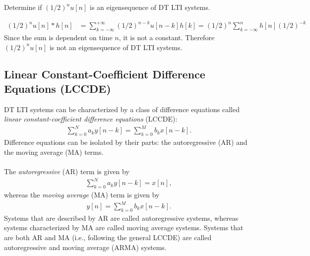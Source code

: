 \documentclass{report}
\begin{document}
\begin{example}
    Determine if $(1/2)^n u[n]$ is an eigensequence of DT LTI systems.
\end{example}
\begin{solution}
    \begin{align*}
        (1/2)^n u[n] * h[n] &= \sum_{k=-\infty}^{+\infty} (1/2)^{n-k}u[n-k]h[k] = (1/2)^n \sum_{k=-\infty}^{n} h[n](1/2)^{-k}
    \end{align*}
    Since the sum is dependent on time $n$, it is not a constant. Therefore $(1/2)^n u[n]$ is not an eigensequence of DT LTI systems.
\end{solution}

\subsection{Linear Constant-Coefficient Difference Equations (LCCDE)}
DT LTI systems can be characterized by a class of difference equations called 
\emph{linear constant-coefficient difference equations} (LCCDE):
\begin{align}
    \sum_{k=0}^{N} a_k y[n-k] = \sum_{k=0}^{M} b_k x[n-k].
\end{align}
Difference equations can be isolated by their parts: the autoregressive (AR) and the moving average (MA) terms. 
\\ \\
The \emph{autoregressive} (AR) term is given by 
\begin{align}
    \sum_{k=0}^{N} a_k y[n-k] = x[n],
\end{align}
whereas the \emph{moving average} (MA) term is given by
\begin{align}
    y[n] = \sum_{k=0}^{M} b_k x[n-k].
\end{align}
Systems that are described by AR are called autoregressive systems, whereas systems characterized by MA are called moving average systems. Systems that 
are both AR and MA (i.e., following the general LCCDE) are called autoregressive and moving average (ARMA) systems.
\end{document}
